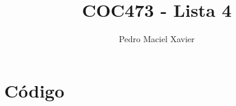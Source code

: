 \documentclass{homework}
\title{COC473 - Lista 4}
\author{Pedro Maciel Xavier}
\begin{document}
	
	\maketitle
	
	\quest%

	\pagebreak
	\appendixpage
	\appendix \section*{Código}
%		
\end{document}
